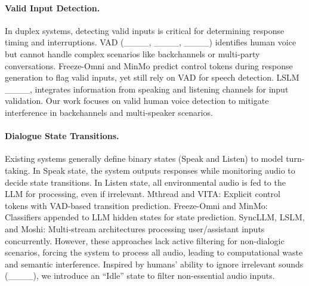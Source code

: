 \paragraph{Valid Input Detection.}
In duplex systems, detecting valid inputs is critical for determining response timing and interruptions. VAD (____, ____, ____) identifies human voice but cannot handle complex scenarios like backchannels or multi-party conversations. Freeze-Omni and MinMo predict control tokens during response generation to flag valid inputs, yet still rely on VAD for speech detection. LSLM ____, integrates information from speaking and listening channels for input validation. Our work focuses on valid human voice detection to mitigate interference in backchannels and multi-speaker scenarios.

\paragraph{Dialogue State Transitions.}
Existing systems generally define binary states (Speak and Listen) to model turn-taking. In Speak state, the system outputs responses while monitoring audio to decide state transitions. In Listen state, all environmental audio is fed to the LLM for processing, even if irrelevant. Mthread and VITA: Explicit control tokens with VAD-based transition prediction. Freeze-Omni and MinMo: Classifiers appended to LLM hidden states for state prediction. SyncLLM, LSLM, and Moshi: Multi-stream architectures processing user/assistant inputs concurrently. However, these approaches lack active filtering for non-dialogic scenarios, forcing the system to process all audio, leading to computational waste and semantic interference. Inspired by humans’ ability to ignore irrelevant sounds (____), we introduce an ``Idle'' state to filter non-essential audio inputs.